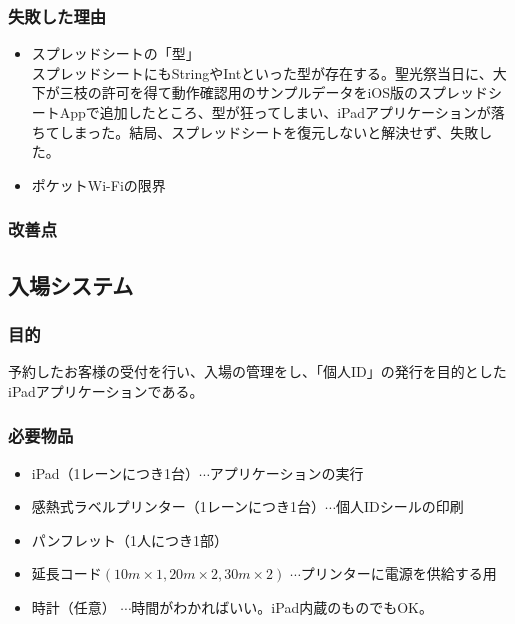 \documentclass[dvipdfmx,jb5]{jarticle}
\begin{document}
\subsubsection{失敗した理由}
 \begin{itemize}
  \item スプレッドシートの「型」\\
  スプレッドシートにもStringやIntといった型が存在する。聖光祭当日に、大下が三枝の許可を得て動作確認用のサンプルデータをiOS版のスプレッドシートAppで追加したところ、型が狂ってしまい、iPadアプリケーションが落ちてしまった。結局、スプレッドシートを復元しないと解決せず、失敗した。
  \item ポケットWi-Fiの限界\\


 \end{itemize}
\subsubsection{改善点}
\subsection{入場システム}
\subsubsection{目的}
予約したお客様の受付を行い、入場の管理をし、「個人ID」の発行を目的としたiPadアプリケーションである。
\subsubsection{必要物品}
 \begin{itemize}
 \item iPad（1レーンにつき1台）$\cdots$アプリケーションの実行
 \item 感熱式ラベルプリンター（1レーンにつき1台）$\cdots$個人IDシールの印刷
 \item パンフレット（1人につき1部）
 \item 延長コード$(10m\times1,20m\times2,30m\times2)$ $\cdots$プリンターに電源を供給する用
 \item 時計（任意） $\cdots$時間がわかればいい。iPad内蔵のものでもOK。
 \end{itemize}
\end{document}

